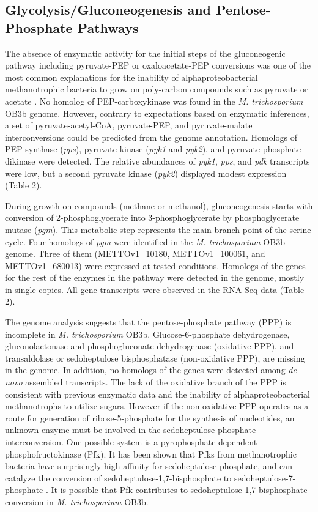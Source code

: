 \subsection{Glycolysis/Gluconeogenesis and Pentose-Phosphate Pathways}
The absence of enzymatic activity for the initial steps of the gluconeogenic pathway including pyruvate-PEP or oxaloacetate-PEP conversions was one of the most common explanations for the inability of alphaproteobacterial methanotrophic bacteria to grow on poly-carbon compounds such as pyruvate or acetate \cite{patel1979, shishkina1982}.
No homolog of PEP-carboxykinase was found in the \textit{M. trichosporium} OB3b genome.
However, contrary to expectations based on enzymatic inferences, a set of pyruvate-acetyl-CoA, pyruvate-PEP, and pyruvate-malate interconversions could be predicted from the genome annotation.
Homologs of PEP synthase (\textit{pps}), pyruvate kinase (\textit{pyk1} and \textit{pyk2}), and pyruvate phosphate dikinase were detected.
The relative abundances of \textit{pyk1}, \textit{pps}, and \textit{pdk} transcripts were low, but a second pyruvate kinase (\textit{pyk2}) displayed modest expression (Table 2).

During growth on  compounds (methane or methanol), gluconeogenesis starts with conversion of 2-phosphoglycerate into 3-phosphoglycerate by phosphoglycerate mutase (\textit{pgm}).
This metabolic step represents the main branch point of the serine cycle.
Four homologs of \textit{pgm} were identified in the \textit{M. trichosporium} OB3b genome.
Three of them (METTOv1\_10180, METTOv1\_100061, and METTOv1\_680013) were expressed at tested conditions.
Homologs of the genes for the rest of the enzymes in the pathway were detected in the genome, mostly in single copies.
All gene transcripts were observed in the RNA-Seq data (Table 2).

The genome analysis suggests that the pentose-phosphate pathway (PPP) is incomplete in \textit{M. trichosporium} OB3b.
Glucose-6-phosphate dehydrogenase, gluconolactonase and phosphogluconate dehydrogenase (oxidative PPP), and transaldolase or sedoheptulose bisphosphatase (non-oxidative PPP), are missing in the genome.
In addition, no homologs of the genes were detected among \textit{de novo} assembled transcripts.
The lack of the oxidative branch of the PPP is consistent with previous enzymatic data and the inability of alphaproteobacterial methanotrophs to utilize sugars.
However if the non-oxidative PPP operates as a route for generation of ribose-5-phosphate for the synthesis of nucleotides, an unknown enzyme must be involved in the sedoheptulose-phosphate interconversion.
One possible system is a pyrophosphate-dependent phosphofructokinase (Pfk).
It has been shown that Pfks from methanotrophic bacteria have surprisingly high affinity for sedoheptulose phosphate, and can catalyze the conversion of sedoheptulose-1,7-bisphosphate to sedoheptulose-7-phosphate \cite{reshetnikov2008, rozova2012}.
It is possible that Pfk contributes to sedoheptulose-1,7-bisphosphate conversion in \textit{M. trichosporium} OB3b.


